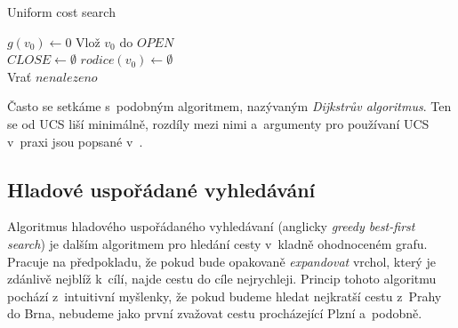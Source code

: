 \documentclass[12pt]{report}			%
\begin{document}
			\begin{algorithm}[H]

			    \caption{Uniform cost search}
			    \label{ucs}
  				$g(v_0) \gets 0$ 
  				Vlož $v_0$ do $OPEN$\\
  				
  				$CLOSE \gets \emptyset$ 
  				$rodice(v_0) \gets \emptyset$\\ %
  				
  				Vrať $nenalezeno$
		\end{algorithm}
				
				Často se setkáme s~podobným algoritmem, nazývaným \emph{Dijkstrův algoritmus}. Ten se od UCS liší minimálně, rozdíly mezi nimi a~argumenty pro používaní UCS v~praxi jsou popsané v~\cite{felner}.
			
			\subsection{Hladové uspořádané vyhledávání}
			Algoritmus hladového uspořádaného vyhledávaní (anglicky \emph{greedy best-first search}) je dalším algoritmem pro hledání cesty v~kladně ohodnoceném grafu. Pracuje na předpokladu, že pokud bude opakovaně \emph{expandovat} vrchol, který je zdánlivě nejblíž k~cílí, najde cestu do cíle nejrychleji. Princip tohoto algoritmu pochází z~intuitivní myšlenky, že pokud budeme hledat nejkratší cestu z~Prahy do Brna, nebudeme jako první zvažovat cestu procházející Plzní a~podobně. 
			
\end{document}
